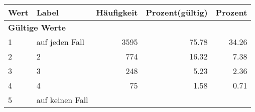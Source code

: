      \begin{longtable}{lXrrr}
     \toprule
     \textbf{Wert} & \textbf{Label} & \textbf{Häufigkeit} & \textbf{Prozent(gültig)} & \textbf{Prozent} \\
     \endhead
     \midrule
     \multicolumn{5}{l}{\textbf{Gültige Werte}}\\

     1 &
     \multicolumn{1}{X}{ auf jeden Fall   } &


       \num{3595} &
       \num[round-mode=places,round-precision=2]{75,78} &
         \num[round-mode=places,round-precision=2]{34,26} \\

     2 &
     \multicolumn{1}{X}{ 2   } &


       \num{774} &
       \num[round-mode=places,round-precision=2]{16,32} &
         \num[round-mode=places,round-precision=2]{7,38} \\

     3 &
     \multicolumn{1}{X}{ 3   } &


       \num{248} &
       \num[round-mode=places,round-precision=2]{5,23} &
         \num[round-mode=places,round-precision=2]{2,36} \\

     4 &
     \multicolumn{1}{X}{ 4   } &


       \num{75} &
       \num[round-mode=places,round-precision=2]{1,58} &
         \num[round-mode=places,round-precision=2]{0,71} \\

     5 &
     \multicolumn{1}{X}{ auf keinen Fall   } &



\end{longtable}
